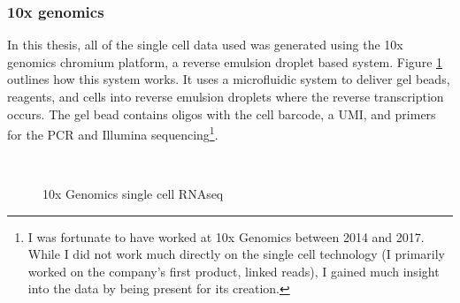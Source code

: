 \subsubsection{10x genomics}

\par{
In this thesis, all of the single cell data used was generated using the 10x genomics chromium platform, a reverse emulsion droplet based system. Figure \ref{figure:10xsinglecell} outlines how this system works. It uses a microfluidic system to deliver gel beads, reagents, and cells into reverse emulsion droplets where the reverse transcription occurs. The gel bead contains oligos with the cell barcode, a UMI, and primers for the PCR and Illumina sequencing\cite{10xsinglecell}\footnote{I was fortunate to have worked at 10x Genomics between 2014 and 2017. While I did not work much directly on the single cell technology (I primarily worked on the company's first product, linked reads), I gained much insight into the data by being present for its creation.}.
}
\begin{figure}[htbp!]
\caption{10x Genomics single cell RNAseq}
\label{figure:10xsinglecell}
\begin{centering}
 \\
\end{centering}
\end{figure}

